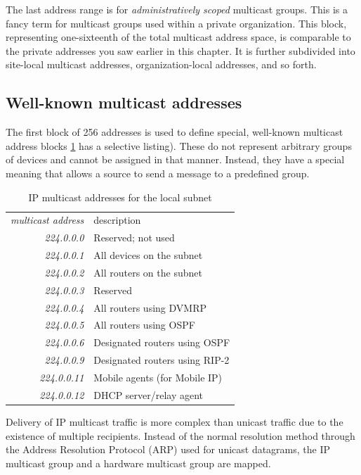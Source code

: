 The last address range is for {\emph{administratively scoped}} multicast
groups. This is a fancy term for multicast groups used within a private
organization. This block, representing one-sixteenth of the total
multicast address space, is comparable to the private addresses you saw
earlier in this chapter. It is further subdivided into site-local
multicast addresses, organization-local addresses, and so
forth.

\subsection{Well-known multicast addresses}

The first block of 256 addresses is used to define special, well-known multicast address blocks \cref{tab:link-local-multicast} has a selective listing).
These do not represent arbitrary groups of devices and cannot be assigned in that manner.
Instead, they have a
special meaning that allows a source to send a message to a predefined
group.


\begin{table}
   \centering
   \begin{tabular}{rl}
   \emph{multicast address} & description\\[.75ex]
   \textit{224.0.0.0}       & Reserved; not used\\
   \textit{224.0.0.1}       & All devices on the subnet\\
   \textit{224.0.0.2}       & All routers on the subnet\\
   \textit{224.0.0.3}       & Reserved\\
   \textit{224.0.0.4}       & All routers using DVMRP\\
   \textit{224.0.0.5}       & All routers using OSPF\\
   \textit{224.0.0.6}       & Designated routers using OSPF\\
   \textit{224.0.0.9}       & Designated routers using RIP-2\\
   \textit{224.0.0.11}      & Mobile agents (for Mobile IP)\\
   \textit{224.0.0.12}      & DHCP server/relay agent\\
   \end{tabular}
   \caption{IP multicast addresses for the local subnet}
   \label{tab:link-local-multicast}
\end{table}

Delivery of IP multicast traffic is more complex than unicast traffic due to the existence of multiple recipients.
Instead of the normal resolution method through the Address Resolution Protocol (ARP) used for unicast datagrams, the IP multicast group and a hardware multicast group are mapped.




